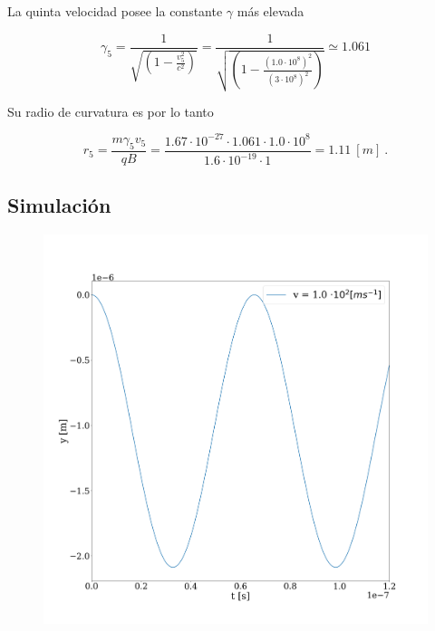 \documentclass[journal]{IEEEtran}
\begin{document}
La quinta velocidad posee la constante $\gamma$ más elevada

\begin{equation}
\gamma_5 = \displaystyle\frac{1}{\sqrt{(1-\displaystyle\frac{v_5^2}{c^2})}} = \displaystyle\frac{1}{\sqrt{(1-\displaystyle\frac{(1.0\cdot 10^8)^2}{(3\cdot 10^8)^2})}} \simeq 1.061
\end{equation}

Su radio de curvatura es por lo tanto

\begin{equation}
r_5 = \displaystyle\frac{m\gamma_5v_5}{qB} = \displaystyle\frac{1.67\cdot 10^{-27}\cdot 1.061 \cdot 1.0\cdot 10^8}{1.6\cdot 10^{-19}\cdot 1} = 1.11 ~[m]~.
\end{equation}

\subsection{Simulación}

\begin{figure}
    \centering
    \includegraphics[width=\linewidth]{freq_rel_1.png}
\end{figure}
\end{document}
